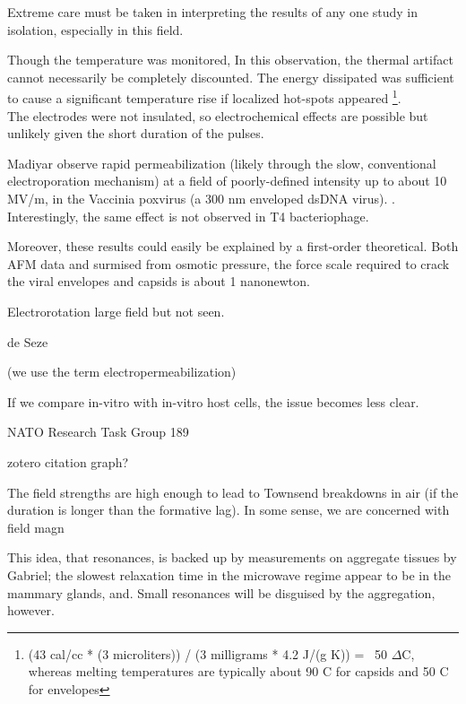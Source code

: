 \documentclass[paper.tex]{subfiles}
\begin{document}
\begin{multicols}{1}
\begin{autem}
Extreme care must be taken in interpreting the results of any one study in isolation, especially in this field. 

Though the temperature was monitored, In this observation, the thermal artifact cannot necessarily be completely discounted. The energy dissipated was sufficient to cause a significant temperature rise if localized hot-spots appeared \footnote{(43 cal/cc * (3 microliters)) / (3 milligrams * 4.2 J/(g K)) = ~50 $\Delta$C, whereas melting temperatures are typically about 90 C for capsids \cite{Thermal1999} and 50 C for envelopes\cite{Stability1985}}. \\ The electrodes were not insulated, so electrochemical effects are possible but unlikely given the short duration of the pulses. 
\end{autem}

Madiyar \cite{Manipulation2013} observe rapid permeabilization (likely through the slow, conventional electroporation mechanism) at a field of poorly-defined intensity up to about 10 MV/m, in the Vaccinia poxvirus (a 300 nm enveloped dsDNA virus). \cite{AC2017}. Interestingly, the same effect is not observed in T4 bacteriophage. 

Moreover, these results could easily be explained by a first-order theoretical. Both AFM data and surmised from osmotic pressure, the force scale required to crack the viral envelopes and capsids is about 1 nanonewton. 


Electrorotation large field but not seen.

de Seze





\pagebreak

(we use the term electropermeabilization)


If we compare in-vitro with in-vitro host cells, the issue becomes less clear.


NATO Research Task Group 189 \cite{treatyelectromagnetic}

zotero citation graph?


The field strengths are high enough to lead to Townsend breakdowns in air (if the duration is longer than the formative lag). In some sense, we are concerned with field magn

This idea, that resonances, is backed up by measurements on aggregate tissues by Gabriel; the slowest relaxation time in the microwave regime appear to be in the mammary glands, and. Small resonances will be disguised by the aggregation, however.



\end{multicols}
\end{document}
